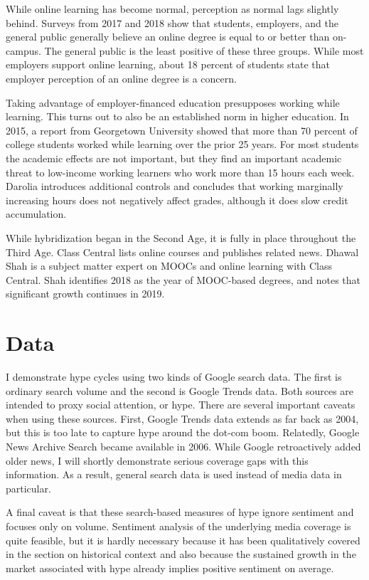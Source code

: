 \documentclass[review]{elsarticle}
\begin{document}
While online learning has become normal, perception as normal lags slightly behind.
Surveys from 2017 and 2018 show that students, employers, and the general public generally believe
an online degree is equal to or better than on-campus\cite{venable_2019}.
The general public is the least positive of these three groups.
While most employers support online learning,
about 18 percent of students state that employer perception of an online degree is a concern.

Taking advantage of employer-financed education presupposes working while learning.
This turns out to also be an established norm in higher education.
In 2015, a report from Georgetown University showed that more than 70 percent of college students
worked while learning over the prior 25 years\cite{carnevale2015learning}.
For most students the academic effects are not important,
but they find an important academic threat to low-income working learners who work more than 15 hours each week.
Darolia\cite{darolia2014working} introduces additional controls and concludes that working
marginally increasing hours does not negatively affect grades, although it does slow credit accumulation.

While hybridization began in the Second Age, it is fully in place throughout the Third Age.
Class Central lists online courses and publishes related news.
Dhawal Shah is a subject matter expert on MOOCs and online learning with Class Central.
Shah identifies 2018 as the year of MOOC-based degrees, and notes that significant growth continues in 2019\cite{shah_2019}.

\section{Data}

I demonstrate hype cycles using two kinds of Google search data.
The first is ordinary search volume and the second is Google Trends data.
Both sources are intended to proxy social attention, or hype.
There are several important caveats when using these sources.
First, Google Trends data extends as far back as 2004,
but this is too late to capture hype around the dot-com boom.
Relatedly, Google News Archive Search became available in 2006.
While Google retroactively added older news, I will shortly demonstrate serious coverage gaps with this information.
As a result, general search data is used instead of media data in particular.

A final caveat is that these search-based measures of hype ignore sentiment and focuses only on volume.
Sentiment analysis of the underlying media coverage is quite feasible,
but it is hardly necessary because it has been qualitatively covered in the section on historical context
and also because the sustained growth in the market associated with hype already implies positive sentiment on average.
\end{document}
